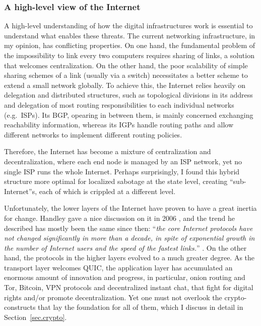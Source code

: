 \documentclass{article}
\begin{document}
\subsubsection{A high-level view of the Internet}
A high-level understanding of how the digital infrastructures work is essential
to understand what enables these threats. The current networking infrastructure,
in my opinion, has conflicting properties. On one hand, the fundamental problem
of the impossibility to link every two computers requires sharing of links, a
solution that welcomes centralization. On the other hand, the poor scalability
of simple sharing schemes of a link (usually via a switch) necessitates a
better scheme to extend a small network globally. To achieve this, the Internet
relies heavily on delegation and distributed structures, such as topological
divisions in its address and delegation of most routing responsibilities to
each individual networks (e.g.\ ISPs). Its BGP, opearing in between them, is
mainly concerned exchanging reachability information, whereas its IGPs handle
routing paths and allow different networks to implement different routing
policies.

Therefore, the Internet has become a mixture of centralization and
decentralization, where each end node is managed by an ISP network, yet no
single ISP runs the whole Internet. Perhaps surprisingly, I found this hybrid
structure more optimal for localized sabotage at the state level, creating
``sub-Internet''s, each of which is crippled at a different level. 

Unfortunately, the lower layers of the Internet have proven to have a great
inertia for change.  Handley gave a nice discussion on it in 2006
\cite{why.internet.just.works}, and the trend he described has mostly been the
same since then: ``\emph{the core Internet protocols have not changed
significantly in more than a decade, in spite of exponential growth in the
number of Internet users and the speed of the fastest links.}''
\cite{why.internet.just.works}. On the other hand, the protocols in the higher
layers evolved to a much greater degree. As the transport layer welcomes
QUIC\cite{quic}, the application layer has accumulated an enormous amount of
innovation and progress, in particular, onion routing and
Tor\cite{onion.routing, tor}, Bitcoin\cite{bitcoin}, VPN
protocols\cite{openvpn, wireguard} and decentralized instant chat\cite{matrix,
tox}, that fight for digital rights and/or promote decentralization. Yet one
must not overlook the crypto-constructs that lay the foundation for all of
them, which I discuss in detail in Section~\ref{sec.crypto}.
\end{document}
